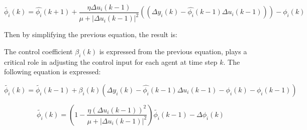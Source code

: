 \documentclass[journal,onecolumn]{IEEEtran}
\begin{document}
\begin{equation}
    \label{model 15}
    \tilde{\phi_i}(k) = \hat{\phi_i}(k+1) + \frac{\eta \Delta u_i(k-1)}{\mu + | \Delta u_i(k-1)|^2}  ((\Delta y_i(k) - \hat{\phi_i}(k-1)\Delta u_i(k-1) )) - \phi_i(k)
\end{equation}

Then by simplifying the previous equation, the result is:



The control coefficient \(\beta_i(k)\) is expressed from the previous equation, plays a critical role in adjusting the control input for each agent at time step $k$. The following equation is expressed:

 
\begin{equation}
    \label{model 17}
    \tilde{\phi_i}(k) = \tilde{\phi_i}(k-1)+\beta_i(k)  (\Delta y_i(k) - \hat{\phi_i}(k-1)\Delta u_i(k-1) -\phi_i(k) - \phi_i(k-1))
\end{equation}


\begin{equation}
    \label{model 19}
    \tilde{\phi_i}(k) = (1-\frac{\eta(\Delta u_i(k-1))^2}{\mu + |\Delta u_i(k-1)|^2})\tilde{\phi_i}(k-1) - \Delta \phi_i(k)
\end{equation}



\end{document}
